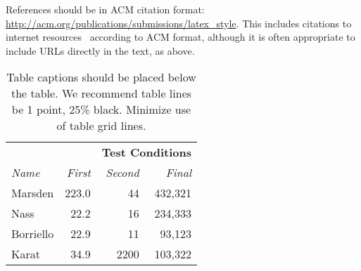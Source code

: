 \documentclass[chi_draft]{sigchi}
\begin{document}
References should be in ACM citation format:
\url{http://acm.org/publications/submissions/latex_style}. This
includes citations to internet
resources~\cite{acm_categories,cavender:writing,CHINOSAUR:venue,psy:gangnam}
according to ACM format, although it is often appropriate to include
URLs directly in the text, as above.




\begin{table}
  \centering
  \begin{tabular}{l r r r}
    & & \multicolumn{2}{c}{\small{\textbf{Test Conditions}}} \\
    \cmidrule(r){3-4}
    {\small\textit{Name}}
    & {\small \textit{First}}
      & {\small \textit{Second}}
    & {\small \textit{Final}} \\
    \midrule
    Marsden & 223.0 & 44 & 432,321 \\
    Nass & 22.2 & 16 & 234,333 \\
    Borriello & 22.9 & 11 & 93,123 \\
    Karat & 34.9 & 2200 & 103,322 \\
  \end{tabular}
  \caption{Table captions should be placed below the table. We
    recommend table lines be 1 point, 25\% black. Minimize use of
    table grid lines.}~\label{tab:table1}
\end{table}
\end{document}
